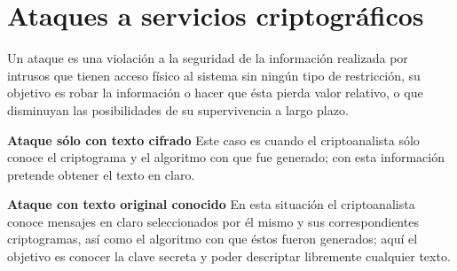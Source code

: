 \section{Ataques a servicios criptográficos}
Un ataque es una violación a la seguridad de la información realizada por intrusos que tienen acceso físico al sistema sin ningún tipo de restricción, su objetivo es robar la información o hacer que ésta pierda valor relativo, o que disminuyan las posibilidades de su supervivencia a largo plazo.


\textbf{Ataque sólo con texto cifrado}
Este caso es cuando el criptoanalista sólo conoce el criptograma y el algoritmo con que fue generado; con esta información pretende obtener el texto en claro.

\textbf{Ataque con texto original conocido}
En esta situación el criptoanalista conoce mensajes en claro seleccionados por él mismo y sus correspondientes criptogramas, así como el algoritmo con que éstos fueron generados; aquí el objetivo es conocer la clave secreta y poder descriptar libremente cualquier texto.

